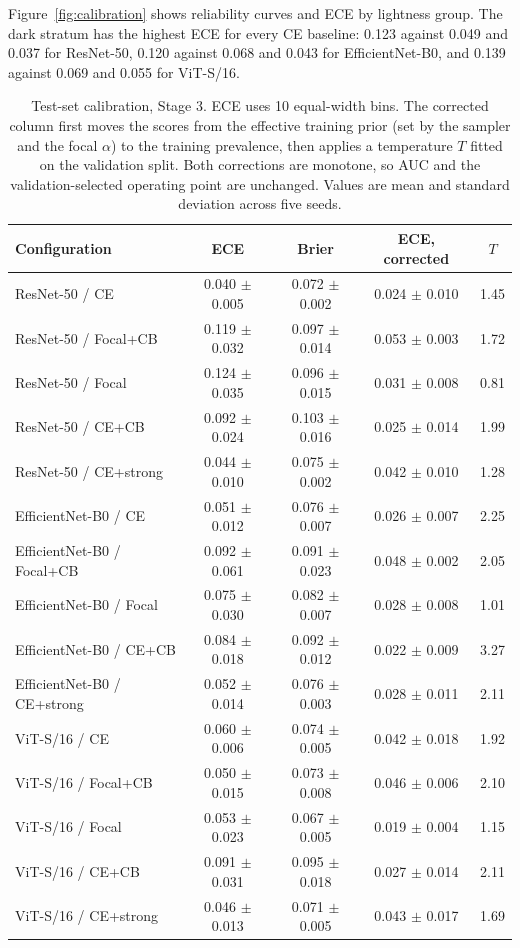 \documentclass[11pt]{article}
\begin{document}
Figure~\ref{fig:calibration} shows reliability curves and ECE by lightness group. The dark stratum has the highest ECE for every CE baseline: 0.123 against 0.049 and 0.037 for ResNet-50, 0.120 against 0.068 and 0.043 for EfficientNet-B0, and 0.139 against 0.069 and 0.055 for ViT-S/16.

\begin{table}[t]
\centering
\small
\caption{Test-set calibration, Stage 3. ECE uses 10 equal-width bins. The corrected column first moves the scores from the effective training prior (set by the sampler and the focal $\alpha$) to the training prevalence, then applies a temperature $T$ fitted on the validation split. Both corrections are monotone, so AUC and the validation-selected operating point are unchanged. Values are mean and standard deviation across five seeds.}
\label{tab:calibration}
\begin{tabular}{lcccc}
\toprule
Configuration & ECE & Brier & ECE, corrected & $T$ \\
\midrule
ResNet-50 / CE & 0.040 $\pm$ 0.005 & 0.072 $\pm$ 0.002 & 0.024 $\pm$ 0.010 & 1.45 \\
ResNet-50 / Focal+CB & 0.119 $\pm$ 0.032 & 0.097 $\pm$ 0.014 & 0.053 $\pm$ 0.003 & 1.72 \\
ResNet-50 / Focal & 0.124 $\pm$ 0.035 & 0.096 $\pm$ 0.015 & 0.031 $\pm$ 0.008 & 0.81 \\
ResNet-50 / CE+CB & 0.092 $\pm$ 0.024 & 0.103 $\pm$ 0.016 & 0.025 $\pm$ 0.014 & 1.99 \\
ResNet-50 / CE+strong & 0.044 $\pm$ 0.010 & 0.075 $\pm$ 0.002 & 0.042 $\pm$ 0.010 & 1.28 \\
EfficientNet-B0 / CE & 0.051 $\pm$ 0.012 & 0.076 $\pm$ 0.007 & 0.026 $\pm$ 0.007 & 2.25 \\
EfficientNet-B0 / Focal+CB & 0.092 $\pm$ 0.061 & 0.091 $\pm$ 0.023 & 0.048 $\pm$ 0.002 & 2.05 \\
EfficientNet-B0 / Focal & 0.075 $\pm$ 0.030 & 0.082 $\pm$ 0.007 & 0.028 $\pm$ 0.008 & 1.01 \\
EfficientNet-B0 / CE+CB & 0.084 $\pm$ 0.018 & 0.092 $\pm$ 0.012 & 0.022 $\pm$ 0.009 & 3.27 \\
EfficientNet-B0 / CE+strong & 0.052 $\pm$ 0.014 & 0.076 $\pm$ 0.003 & 0.028 $\pm$ 0.011 & 2.11 \\
ViT-S/16 / CE & 0.060 $\pm$ 0.006 & 0.074 $\pm$ 0.005 & 0.042 $\pm$ 0.018 & 1.92 \\
ViT-S/16 / Focal+CB & 0.050 $\pm$ 0.015 & 0.073 $\pm$ 0.008 & 0.046 $\pm$ 0.006 & 2.10 \\
ViT-S/16 / Focal & 0.053 $\pm$ 0.023 & 0.067 $\pm$ 0.005 & 0.019 $\pm$ 0.004 & 1.15 \\
ViT-S/16 / CE+CB & 0.091 $\pm$ 0.031 & 0.095 $\pm$ 0.018 & 0.027 $\pm$ 0.014 & 2.11 \\
ViT-S/16 / CE+strong & 0.046 $\pm$ 0.013 & 0.071 $\pm$ 0.005 & 0.043 $\pm$ 0.017 & 1.69 \\
\bottomrule
\end{tabular}
\end{table}
\end{document}
